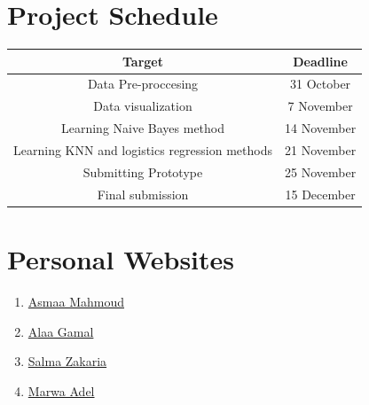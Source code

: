 \documentclass[a4paper, 11pt, oneside]{article} %
\begin{document}
\section{Project Schedule}
\begin{table}[H]
\centering %
\begin{tabular}{c c } %
\hline\hline %
Target & Deadline \\ [0.5ex] %
\hline %
Data Pre-proccesing & 31 October \\ %
Data visualization & 7 November \\
Learning Naive Bayes method & 14 November  \\
Learning KNN and logistics regression methods   & 21 November \\
Submitting Prototype & 25 November \\
Final submission & 15 December \\ [1ex] %
\hline %
\end{tabular}
\label{table:nonlin} %
\end{table}
\vfil


\section{Personal Websites}
\begin{enumerate}
\item \href{https://asmaamahmoud12.github.io/Asmaa-Mahmoud/}{Asmaa Mahmoud}
\item \href{https://alaagamal98.github.io/}{Alaa Gamal}
\item \href{https://salmazakariia.github.io/SalmaZakaria/}{Salma Zakaria}
\item \href{https://marwaayosiif.github.io/MarwaYoussif/}{Marwa Adel}
\end{enumerate}
\end{document}
